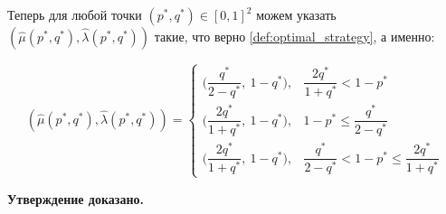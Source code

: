 Теперь для любой точки $(p^*,q^*) \in [0,1]^2$ можем указать
$(\hat \mu(p^*,q^*), \hat \lambda(p^*,q^*))$ такие, что верно \eqref{def:optimal_strategy},
а именно:
 
$$
(\hat \mu(p^*,q^*), \hat \lambda(p^*,q^*)) = 
\begin{cases}
	\Big(\dfrac{q^*}{2 - q^*}, \: 1 - q^* \Big), &
	\dfrac{2 q^*}{1 + q^*} < 1 - p^*
	\\
	\Big(\dfrac{2 q^*}{1 + q^*}, \: 1 - q^* \Big), &
	1 - p^* \leqslant \dfrac{q^*}{2 - q^*}
	\\
	\Big(\dfrac{2 q^*}{1 + q^*}, \: 1 - q^*\Big), & 	
	\dfrac{q^*}{2 - q^{*}} < 1 - p^* \leqslant \dfrac{2 q^*}{1 + q^*}
\end{cases}
$$

\textbf{Утверждение доказано.}